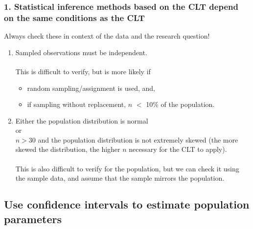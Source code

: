 \documentclass[slidestop,compress,mathserif,12pt,t,professionalfonts,xcolor=table]{beamer}
\begin{document}
\begin{frame}
\frametitle{1. Statistical inference methods based on the CLT depend on the same conditions as the CLT}

Always check these in context of the data and the research question!

\begin{enumerate}

\item {} Sampled observations must be independent. \\

$\:$ \\
This is difficult to verify, but is more likely if
\begin{itemize}
\item random sampling/assignment is used, and,
\item if sampling without replacement, $n$ $<$ 10\% of the population.
\end{itemize}

\item {} Either the population distribution is normal \\
or\\
$n > 30$ and the population distribution is not extremely skewed (the more skewed the distribution, the higher $n$ necessary for the CLT to apply).\\
$\:$ \\
This is also difficult to verify for the population, but we can check it using the sample data, and assume that the sample mirrors the population.

\end{enumerate}


\end{frame}


\subsection{Use confidence intervals to estimate population parameters}
\label{mi2}

\end{document}

